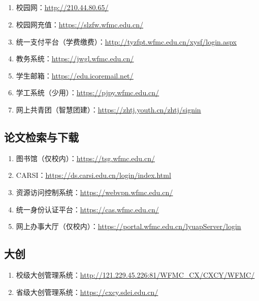 \subsection[日常使用]{\textbf{}}
\begin{enumerate}
    \item 校园网：\uline{\href{http://210.44.80.65/}{http://210.44.80.65/}}
    \item 校园网充值：\uline{\href{https://slzfw.wfmc.edu.cn/}{https://slzfw.wfmc.edu.cn/}}
    \item 统一支付平台（学费缴费）：\uline{\href{http://tyzfpt.wfmc.edu.cn/xysf/login.aspx}{http://tyzfpt.wfmc.edu.cn/xysf/login.aspx}}
    \item 教务系统：\uline{\href{https://jwgl.wfmc.edu.cn/}{https://jwgl.wfmc.edu.cn/}}
    \item 学生邮箱：\uline{\href{https://edu.icoremail.net/}{https://edu.icoremail.net/}}
    \item 学工系统（少用）：\uline{\href{https://pjpy.wfmc.edu.cn/}{https://pjpy.wfmc.edu.cn/}}
    \item 网上共青团（智慧团建）：\uline{\href{https://zhtj.youth.cn/zhtj/signin}{https://zhtj.youth.cn/zhtj/signin}}
\end{enumerate}

\subsection[论文检索与下载]{论文检索与下载}
\begin{enumerate}
    \item 图书馆（仅校内）：\uline{\href{https://tsg.wfmc.edu.cn/}{https://tsg.wfmc.edu.cn/}}
    \item CARSI：\uline{\href{https://ds.carsi.edu.cn/login/index.html}{https://ds.carsi.edu.cn/login/index.html}}
    \item 资源访问控制系统：\uline{\href{https://webvpn.wfmc.edu.cn/}{https://webvpn.wfmc.edu.cn/}}
    \item 统一身份认证平台：\uline{\href{https://cas.wfmc.edu.cn/}{https://cas.wfmc.edu.cn/}}
    \item 网上办事大厅（仅校内）：\uline{\href{https://portal.wfmc.edu.cn/lyuapServer/login}{https://portal.wfmc.edu.cn/lyuapServer/login}}
\end{enumerate}

\subsection[大创]{大创}
\begin{enumerate}
    \item 校级大创管理系统：\uline{\href{http://121.229.45.226:81/WFMC\_CX/CXCY/WFMC/}{http://121.229.45.226:81/WFMC\_CX/CXCY/WFMC/}}
    \item 省级大创管理系统：\uline{\href{https://cxcy.sdei.edu.cn/}{https://cxcy.sdei.edu.cn/}}
\end{enumerate}

